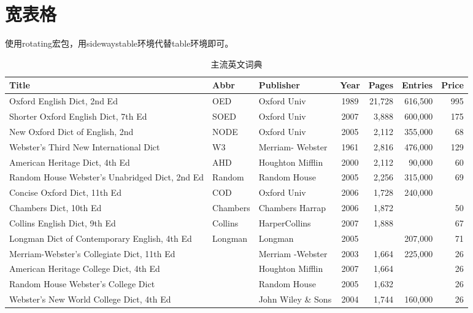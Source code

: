 \documentclass[UTF8]{article}
\begin{document}
\section{宽表格}
使用rotating宏包，用sidewaystable环境代替table环境即可。
\begin{sidewaystable}
	\caption{主流英文词典}
	\label{tab:dict}
	\centering
	\begin{tabularx}{550pt}{Xllcrrr}
		 \toprule
		Title & Abbr & Publisher & Year & Pages & Entries &
		Price \\
		 \midrule
		Oxford English Dict, 2nd Ed & OED & Oxford Univ
	& 1989 & 21,728 & 616,500 & 995 \\
		\midrule
		 Shorter Oxford English Dict, 7th Ed & SOED & Oxford
		Univ
		& 2007 & 3,888 & 600,000 & 175 \\
		 New Oxford Dict of English, 2nd & NODE & Oxford Univ
		& 2005 & 2,112 & 355,000 & 68 \\
		 Webster's Third New International Dict & W3 & Merriam-
		Webster
		& 1961 & 2,816 & 476,000 & 129 \\
		 American Heritage Dict, 4th Ed & AHD & Houghton
		Mifflin
		& 2000 & 2,112 & 90,000 & 60 \\
		 Random House Webster's Unabridged Dict, 2nd Ed &
		Random & Random House
		& 2005 & 2,256 & 315,000 & 69 \\
		 \midrule
		Concise Oxford Dict, 11th Ed & COD & Oxford Univ
		 & 2006 & 1,728 & 240,000 & \\
		Chambers Dict, 10th Ed & Chambers & Chambers Harrap
		 & 2006 & 1,872 & & 50 \\
		Collins English Dict, 9th Ed & Collins & HarperCollins
		 & 2007 & 1,888 & & 67 \\
		Longman Dict of Contemporary English, 4th Ed & Longman
		& Longman
		 & 2005 & & 207,000 & 71 \\
		Merriam-Webster's Collegiate Dict, 11th Ed & & Merriam
		-Webster
		 & 2003 & 1,664 & 225,000 & 26 \\
		American Heritage College Dict, 4th Ed & & Houghton
		Mifflin
		 & 2007 & 1,664 & & 26 \\
		Random House Webster's College Dict & & Random House
		 & 2005 & 1,632 & & 26 \\
		Webster's New World College Dict, 4th Ed & & John
		Wiley \& Sons
		& 2004 & 1,744 & 160,000 & 26 \\
		\bottomrule
		\end{tabularx}
\end{sidewaystable}
\end{document}
